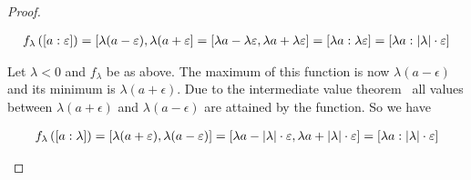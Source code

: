 \begin{proof}
\begin{enumerate}
      \begin{align}
        f_\lambda\left(\an[\epsilon]{a}\right) = \interval{\lambda(a-\epsilon)}{\lambda(a+\epsilon} = \interval{\lambda a - \lambda \epsilon}{\lambda a+\lambda \epsilon} = \an[\lambda \epsilon]{\lambda a} = \an[\abs{\lambda}\cdot \epsilon]{\lambda a}
      \end{align}

      Let $\lambda < 0$ and $f_\lambda$ be as above. The maximum of this function is now $\lambda (a-\epsilon)$ and its minimum is $\lambda (a+\epsilon)$. Due to the intermediate value theorem~\cite{wiki:intermediatevaluetheorem} all values between $\lambda(a+\epsilon)$ and $\lambda(a-\epsilon)$ are attained by the function. So we have

      \begin{align}
        f_\lambda\left(\an[\lambda]{a}\right) = \interval{\lambda(a+\epsilon)}{\lambda(a-\epsilon)} = \interval{\lambda a -\abs{\lambda}\cdot \epsilon}{\lambda a + \abs{\lambda}\cdot \epsilon} = \an[\abs{\lambda}\cdot \epsilon]{\lambda a}
      \end{align}

 \end{enumerate}
\end{proof}



